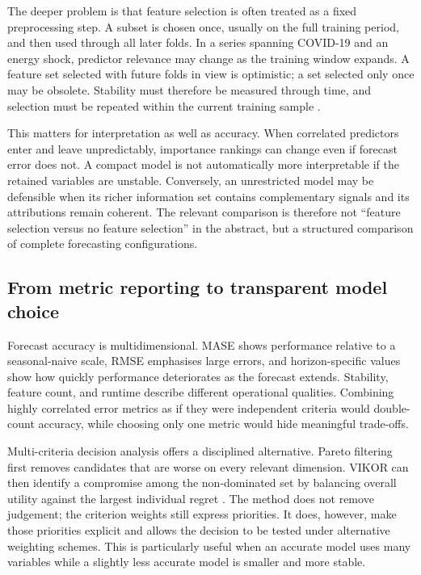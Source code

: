 \documentclass[preprint,12pt]{elsarticle}
\begin{document}
The deeper problem is that feature selection is often treated as a fixed preprocessing step. A subset is chosen once, usually on the full training period, and then used through all later folds. In a series spanning COVID-19 and an energy shock, predictor relevance may change as the training window expands. A feature set selected with future folds in view is optimistic; a set selected only once may be obsolete. Stability must therefore be measured through time, and selection must be repeated within the current training sample \citep{nogueira2018}.

This matters for interpretation as well as accuracy. When correlated predictors enter and leave unpredictably, importance rankings can change even if forecast error does not. A compact model is not automatically more interpretable if the retained variables are unstable. Conversely, an unrestricted model may be defensible when its richer information set contains complementary signals and its attributions remain coherent. The relevant comparison is therefore not ``feature selection versus no feature selection'' in the abstract, but a structured comparison of complete forecasting configurations.

\subsection{From metric reporting to transparent model choice}

Forecast accuracy is multidimensional. MASE shows performance relative to a seasonal-naive scale, RMSE emphasises large errors, and horizon-specific values show how quickly performance deteriorates as the forecast extends. Stability, feature count, and runtime describe different operational qualities. Combining highly correlated error metrics as if they were independent criteria would double-count accuracy, while choosing only one metric would hide meaningful trade-offs.

Multi-criteria decision analysis offers a disciplined alternative. Pareto filtering first removes candidates that are worse on every relevant dimension. VIKOR can then identify a compromise among the non-dominated set by balancing overall utility against the largest individual regret \citep{opricovic2004,opricovic2007}. The method does not remove judgement; the criterion weights still express priorities. It does, however, make those priorities explicit and allows the decision to be tested under alternative weighting schemes. This is particularly useful when an accurate model uses many variables while a slightly less accurate model is smaller and more stable.
\end{document}
